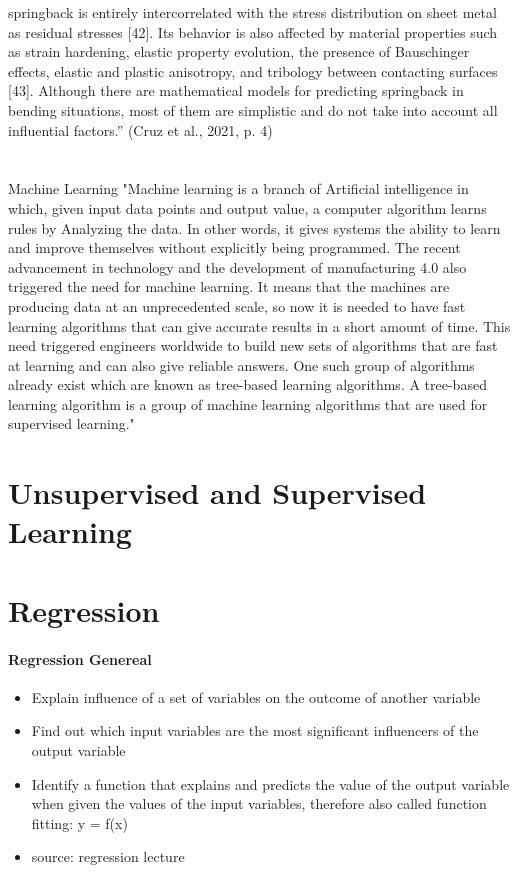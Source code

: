 springback is entirely intercorrelated with the stress distribution on sheet metal as residual stresses [42]. Its behavior is also affected by material properties such as strain hardening, elastic property evolution, the presence of Bauschinger effects, elastic and plastic anisotropy, and tribology between contacting surfaces [43]. Although there are mathematical models for predicting springback in bending situations, most of them are simplistic and do not take into account all influential factors.” (Cruz et al., 2021, p. 4) 

\section{}{Machine Learning}
"Machine learning is a branch of Artificial intelligence in which, given input data points and output value, a computer algorithm learns rules by Analyzing the data. In other words, it gives systems the ability to learn and improve themselves without explicitly being programmed. The recent advancement in technology and the development of manufacturing 4.0 also triggered the need for machine learning. It means that the machines are producing data at an unprecedented scale, so now it is needed to have fast learning algorithms that can give accurate results in a short amount of time. This need triggered engineers worldwide to build new sets of algorithms that are fast at learning and can also give reliable answers. One such group of algorithms already exist which are known as tree-based learning algorithms. A tree-based learning algorithm is a group of machine learning algorithms that are used for supervised learning."
\cite{baig_machinelearningprediction_2021}


\section{Unsupervised and Supervised Learning}
\section{Regression}

\paragraph{Regression Genereal}

\begin{itemize}
    \item Explain influence of a set of variables on the outcome of another variable 
    \item Find out which input variables are the most significant influencers of the output variable 
    \item Identify a function that explains and predicts the value of the output variable when given the values of the input variables, therefore also called function fitting: y = f(x)
    \item source: regression lecture 
\end{itemize}

